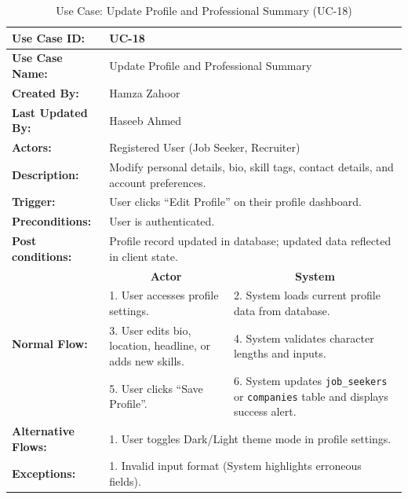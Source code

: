 \begin{table}[H]
\centering
\small
\caption{Use Case: Update Profile and Professional Summary (UC-18)}
\label{tab:uc18_spec}
\begin{tabular}{|p{3.2cm}|p{5.5cm}|p{5.5cm}|}
\hline
\textbf{Use Case ID:} & \multicolumn{2}{p{11.4cm}|}{UC-18} \\ \hline
\textbf{Use Case Name:} & \multicolumn{2}{p{11.4cm}|}{Update Profile and Professional Summary} \\ \hline
\textbf{Created By:} & \multicolumn{2}{p{11.4cm}|}{Hamza Zahoor} \\ \hline
\textbf{Last Updated By:} & \multicolumn{2}{p{11.4cm}|}{Haseeb Ahmed} \\ \hline
\textbf{Actors:} & \multicolumn{2}{p{11.4cm}|}{Registered User (Job Seeker, Recruiter)} \\ \hline
\textbf{Description:} & \multicolumn{2}{p{11.4cm}|}{Modify personal details, bio, skill tags, contact details, and account preferences.} \\ \hline
\textbf{Trigger:} & \multicolumn{2}{p{11.4cm}|}{User clicks ``Edit Profile'' on their profile dashboard.} \\ \hline
\textbf{Preconditions:} & \multicolumn{2}{p{11.4cm}|}{User is authenticated.} \\ \hline
\textbf{Post conditions:} & \multicolumn{2}{p{11.4cm}|}{Profile record updated in database; updated data reflected in client state.} \\ \hline
\multirow{4}{*}{\textbf{Normal Flow:}} & \multicolumn{1}{c|}{\textbf{Actor}} & \multicolumn{1}{c|}{\textbf{System}} \\ \cline{2-3}
& 1. User accesses profile settings. & 2. System loads current profile data from database. \vspace{2pt} \\
& 3. User edits bio, location, headline, or adds new skills. & 4. System validates character lengths and inputs. \vspace{2pt} \\
& 5. User clicks ``Save Profile''. & 6. System updates \texttt{job\_seekers} or \texttt{companies} table and displays success alert. \\ \hline
\textbf{Alternative Flows:} & \multicolumn{2}{p{11.4cm}|}{1. User toggles Dark/Light theme mode in profile settings.} \\ \hline
\textbf{Exceptions:} & \multicolumn{2}{p{11.4cm}|}{1. Invalid input format (System highlights erroneous fields).} \\ \hline
\end{tabular}
\end{table}

